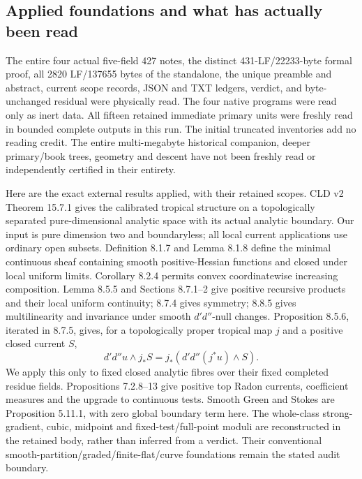 \documentclass[11pt]{article}
\newcommand{\DD}{d'd''}
\begin{document}
\subsection{Applied foundations and what has actually been read}
The entire four actual five-field 427 notes, the distinct 431-LF/22233-byte
formal proof, all 2820 LF/137655 bytes of the standalone, the unique preamble
and abstract, current scope records, JSON and TXT ledgers, verdict, and
byte-unchanged residual were physically read. The four native programs were
read only as inert data. All fifteen retained immediate primary units were
freshly read in bounded complete outputs in this run. The initial truncated
inventories add no reading credit. The entire multi-megabyte historical
companion, deeper primary/book trees, geometry and descent have not been
freshly read or independently certified in their entirety.

Here are the exact external results applied, with their retained scopes.
CLD v2 Theorem 15.7.1 gives the calibrated tropical structure on a
topologically separated pure-dimensional analytic space with its actual
analytic boundary. Our input is pure dimension two and boundaryless; all
local current applications use ordinary open subsets. Definition 8.1.7
and Lemma 8.1.8 define the minimal continuous sheaf containing smooth
positive-Hessian functions and closed under local uniform limits.
Corollary 8.2.4 permits convex coordinatewise increasing composition.
Lemma 8.5.5 and Sections 8.7.1--2 give positive recursive products and
their local uniform continuity; 8.7.4 gives symmetry; 8.8.5 gives
multilinearity and invariance under smooth $\DD$-null changes. Proposition
8.5.6, iterated in 8.7.5, gives, for a topologically proper tropical map $j$
and a positive closed current $S$,
\[
 \DD u\wedge j_*S=j_*(\DD(j^*u)\wedge S).
\]
We apply this only to fixed closed analytic fibres over their fixed completed
residue fields. Propositions 7.2.8--13 give positive top Radon currents,
coefficient measures and the upgrade to continuous tests. Smooth Green and
Stokes are Proposition 5.11.1, with zero global boundary term here.
The whole-class strong-gradient, cubic, midpoint and fixed-test/full-point
moduli are reconstructed in the retained body, rather than inferred from a
verdict. Their conventional smooth-partition/graded/finite-flat/curve
foundations remain the stated audit boundary.
\end{document}

